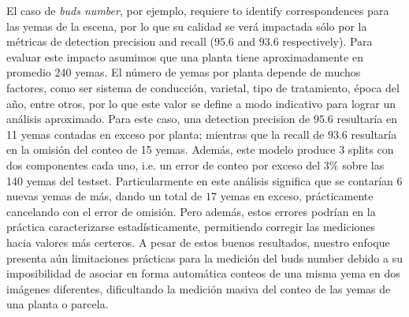 \documentclass[a4paper,authoryear,review]{elsarticle}
\begin{document}
 
%
El caso de \emph{buds number}, por ejemplo, requiere to identify correspondences para las yemas de la escena, por lo que su calidad se verá impactada sólo por la métricas de detection precision and recall ($95.6$ and $93.6$ respectively). Para evaluar este impacto asumimos que una planta tiene aproximadamente en promedio 240 yemas. El número de yemas por planta depende de muchos factores, como ser sistema de conducción, varietal, tipo de tratamiento, época del año, entre otros, por lo que este valor se define a modo indicativo para lograr un análisis aproximado. Para este caso, una detection precision de $95.6$ resultaría en 11 yemas contadas en exceso por planta; mientras que la recall de $93.6$ resultaría en la omisión del conteo de 15 yemas. 
%
Además, este modelo produce 3 splits con dos componentes cada uno, i.e. un error de conteo por exceso del $3\%$ sobre las 140 yemas del testset. Particularmente en este análisis significa que se contarían $6$ nuevas yemas de más, dando un total de $17$ yemas en exceso, prácticamente cancelando con el error de omisión. Pero además, estos errores podrían en la práctica caracterizarse estadísticamente, permitiendo corregir las mediciones hacia valores más certeros. 
%
A pesar de estos buenos resultados, nuestro enfoque presenta aún limitaciones  prácticas para la medición del buds number debido a su imposibilidad de asociar en forma automática conteos de una misma yema en dos imágenes diferentes, dificultando  la medición masiva del conteo de las yemas de una planta o parcela. 
\end{document}
